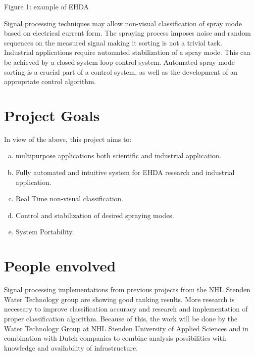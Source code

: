 Figure 1: example of EHDA

Signal processing techniques may allow non-visual classification of spray mode based on electrical current form. 
The spraying process imposes noise and random sequences on the measured signal making it sorting is not a trivial task.
Industrial applications require automated stabilization of a spray mode. 
This can be achieved by a closed system loop control system. 
Automated spray mode sorting is a crucial part of a control system, as well as the development of an appropriate control algorithm.

\section{Project Goals}
\label{sec:goals}

In view of the above, this project aims to:

\begin{enumerate}[a)]
\item multipurpose applications both scientific and industrial application.
\item Fully automated and intuitive system for EHDA research and industrial application.
\item Real Time non-visual classification.    
\item Control and stabilization of desired spraying modes.   
\item System Portability.
\end{enumerate}


\section{People envolved}
\label{sec:companies}


Signal processing implementations from previous projects from the NHL Stenden Water Technology group are showing good ranking results. 
More research is necessary to improve classification accuracy and research and implementation of proper classification algorithm. 
Because of this, the work will be done by the Water Technology Group at NHL Stenden University of Applied Sciences and in combination with Dutch companies to combine analysis possibilities with knowledge and availability of infrastructure.
